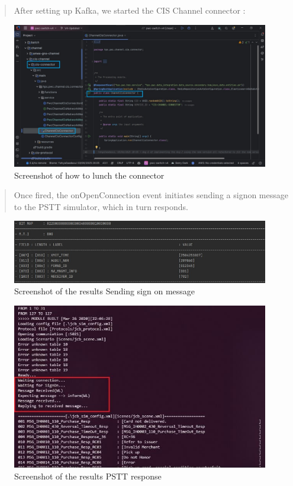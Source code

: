 \documentclass[12pt,a4paper]{report}
\begin{document}
\begin{quote}
After setting up Kafka, we started the CIS Channel connector :
\end{quote}

\begin{figure}[H]
\centering
\includegraphics[width=\textwidth,height=\textheight,keepaspectratio]{media/image72.jpeg}
\caption{Screenshot of how to lunch the connector}
\label{fig:OFDP}
\end{figure} 


\begin{quote}
Once fired, the onOpenConnection event initiates sending a signon
message to the PSTT simulator, which in turn responds.
\end{quote}

\begin{figure}[H]
\centering
\includegraphics[width=\textwidth,height=\textheight,keepaspectratio]{media/image73.jpeg}
\caption{Screenshot of the results Sending sign on message}
\label{fig:OFDP}
\end{figure} 


\begin{figure}[H]
\centering
\includegraphics[width=\textwidth,height=\textheight,keepaspectratio]{media/image74.jpeg}
\caption{Screenshot of the
results PSTT response}
\label{fig:RPR}
\end{figure} 
\end{document}
